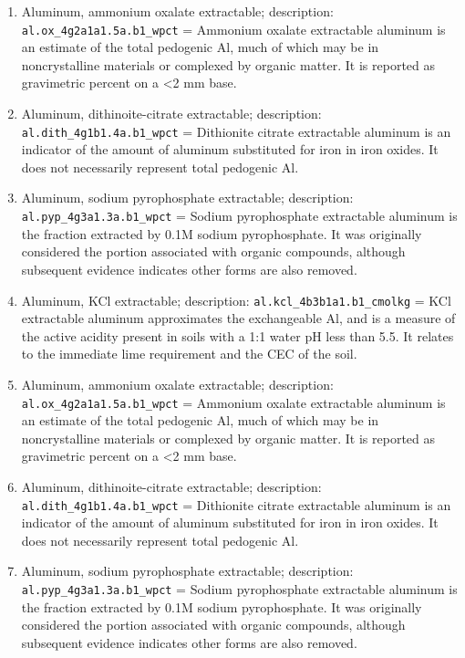 \documentclass[
  graybox,natbib,nospthms]{svmono}
\begin{document}
\begin{enumerate}
\item
  Aluminum, ammonium oxalate extractable; description: \texttt{al.ox\_4g2a1a1.5a.b1\_wpct} = Ammonium oxalate extractable aluminum is an estimate of the total pedogenic Al, much of which may be in noncrystalline materials or complexed by organic matter. It is reported as gravimetric percent on a \textless2 mm base.\\
\item
  Aluminum, dithinoite-citrate extractable; description: \texttt{al.dith\_4g1b1.4a.b1\_wpct} = Dithionite citrate extractable aluminum is an indicator of the amount of aluminum substituted for iron in iron oxides. It does not necessarily represent total pedogenic Al.\\
\item
  Aluminum, sodium pyrophosphate extractable; description: \texttt{al.pyp\_4g3a1.3a.b1\_wpct} = Sodium pyrophosphate extractable aluminum is the fraction extracted by 0.1M sodium pyrophosphate. It was originally considered the portion associated with organic compounds, although subsequent evidence indicates other forms are also removed.\\
\item
  Aluminum, KCl extractable; description: \texttt{al.kcl\_4b3b1a1.b1\_cmolkg} = KCl extractable aluminum approximates the exchangeable Al, and is a measure of the active acidity present in soils with a 1:1 water pH less than 5.5. It relates to the immediate lime requirement and the CEC of the soil.\\
\item
  Aluminum, ammonium oxalate extractable; description: \texttt{al.ox\_4g2a1a1.5a.b1\_wpct} = Ammonium oxalate extractable aluminum is an estimate of the total pedogenic Al, much of which may be in noncrystalline materials or complexed by organic matter. It is reported as gravimetric percent on a \textless2 mm base.\\
\item
  Aluminum, dithinoite-citrate extractable; description: \texttt{al.dith\_4g1b1.4a.b1\_wpct} = Dithionite citrate extractable aluminum is an indicator of the amount of aluminum substituted for iron in iron oxides. It does not necessarily represent total pedogenic Al.\\
\item
  Aluminum, sodium pyrophosphate extractable; description: \texttt{al.pyp\_4g3a1.3a.b1\_wpct} = Sodium pyrophosphate extractable aluminum is the fraction extracted by 0.1M sodium pyrophosphate. It was originally considered the portion associated with organic compounds, although subsequent evidence indicates other forms are also removed.\\

\end{enumerate}
\end{document}
